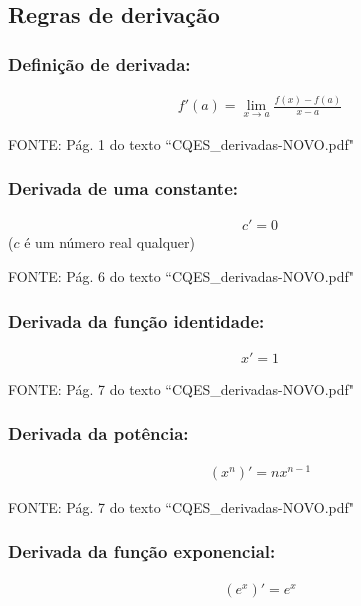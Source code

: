 \documentclass[portuguese,a4paper,12pt,onecolumn,fleqn]{article}
\begin{document}
\subsection*{Regras de derivação}

\subsubsection*{Definição de derivada:}

\begin{gather*}
f'(a) = \lim_{x \to a} \frac{f(x) - f(a)}{x - a}
\end{gather*}

FONTE: Pág. 1 do texto ``CQES\_derivadas-NOVO.pdf"


\subsubsection*{Derivada de uma constante:}

\begin{gather*}
c' = 0 
\end{gather*}
($c$ é um número real qualquer)

FONTE: Pág. 6 do texto ``CQES\_derivadas-NOVO.pdf"


\subsubsection*{Derivada da função identidade:}

\begin{gather*}
x' = 1
\end{gather*}

FONTE: Pág. 7 do texto ``CQES\_derivadas-NOVO.pdf"


\subsubsection*{Derivada da potência:}

\begin{gather*}
(x^n)' = n x^{n-1}
\end{gather*}

FONTE: Pág. 7 do texto ``CQES\_derivadas-NOVO.pdf"


\subsubsection*{Derivada da função exponencial:}

\begin{gather*}
(e^x)' = e^x
\end{gather*}
\end{document}

